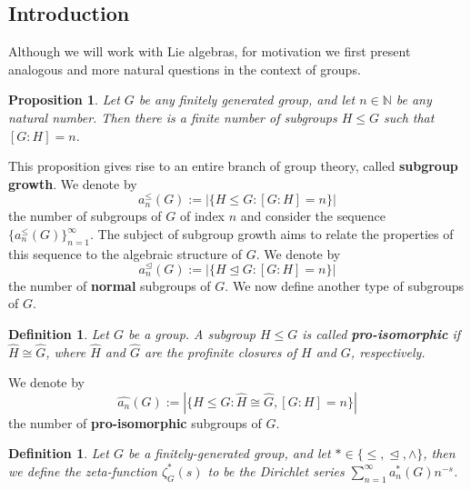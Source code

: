 \documentclass[12pt]{article}
\newtheorem{proposition}[theorem]{Proposition}
\newtheorem{definition}[theorem]{Definition}
\begin{document}
\subsection{Introduction}
Although we will work with Lie algebras, for motivation we first present analogous and more natural questions in the context of groups.
\begin{proposition} \label{prop:finite.number.subgroups}
Let $G$ be any finitely generated group, and let $n\in\mathbb{N}$ be any natural number. Then there is a finite number of subgroups $H\leq G$ such that $[G:H]=n$.
\end{proposition}
This proposition gives rise to an entire branch of group theory, called \textbf{subgroup growth}. We denote by \[a_{n}^{\leq}(G):=|\{H\leq{G} : [G:H]=n\}|\]
the number of subgroups of $G$ of index $n$ and consider the sequence $\{a_{n}^{\leq}(G)\}_{n=1}^{\infty}$. The subject of subgroup growth aims to relate the properties of this sequence to the algebraic structure of $G$. We denote by \[a_{n}^{\trianglelefteq}(G):=|\{H\trianglelefteq{G} : [G:H]=n\}|\]
the number of \textbf{normal} subgroups of $G$. We now define another type of subgroups of $G$.
\begin{definition}
\label{def:pro.isomorphic}
Let $G$ be a group. A subgroup $H\leq G$ is called \textbf{pro-isomorphic} if $\widehat{H}\cong\widehat{G}$, where $\widehat{H}$ and $\widehat{G}$ are the profinite closures of $H$ and $G$, respectively.
\end{definition}
We denote by \[\hat{a_n}(G):=|\{H\leq G : \widehat{H}\cong\widehat{G}, [G:H]=n\}|\]
the number of \textbf{pro-isomorphic} subgroups of $G$.
\begin{definition}
\label{def:zeta.function}
Let $G$ be a finitely-generated group, and let $\ast\in\{\leq,\trianglelefteq,\wedge\}$, then we define the zeta-function $\zeta_{G}^{\ast}(s)$ to be the Dirichlet series $\sum_{n=1}^{\infty}a_{n}^{\ast}(G){n}^{-s}$. 
\end{definition}
\end{document}
